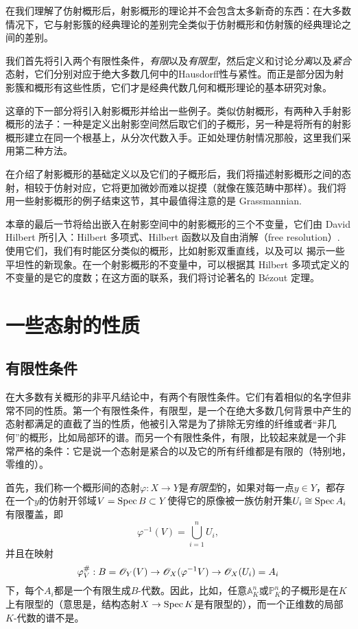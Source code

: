 在我们理解了仿射概形后，射影概形的理论并不会包含太多新奇的东西：在大多数情况下，它与射影簇的经典理论的差别完全类似于仿射概形和仿射簇的经典理论之间的差别。

我们首先将引入两个有限性条件，\textit{有限}以及\textit{有限型}，然后定义和讨论\textit{分离}以及\textit{紧合}态射，它们分别对应于绝大多数几何中的Hausdorff性与紧性。而正是部分因为射影簇和概形有这些性质，它们才是经典代数几何和概形理论的基本研究对象。

这章的下一部分将引入射影概形并给出一些例子。类似仿射概形，有两种入手射影概形的法子：一种是定义出射影空间然后取它们的子概形，另一种是将所有的射影概形建立在同一个根基上，从分次代数入手。正如处理仿射情况那般，这里我们采用第二种方法。

在介绍了射影概形的基础定义以及它们的子概形后，我们将描述射影概形之间的态射，相较于仿射对应，它将更加微妙而难以捉摸（就像在簇范畴中那样）。我们将用一些射影概形的例子结束这节，其中最值得注意的是 Grassmannian.

本章的最后一节将给出嵌入在射影空间中的射影概形的三个不变量，它们由 David Hilbert 所引入：Hilbert 多项式、Hilbert 函数以及自由消解（free resolution）. 使用它们，我们有时能区分类似的概形，比如射影双重直线，以及可以
揭示一些平坦性的新现象。在一个射影概形的不变量中，可以根据其 Hilbert 多项式定义的不变量的是它的度数；在这方面的联系，我们将讨论著名的 B\'{e}zout 定理。

\section{一些态射的性质}\label{s:3.1}

\subsection{有限性条件}\label{s:3.1.1}

在大多数有关概形的非平凡结论中，有两个有限性条件。它们有着相似的名字但非常不同的性质。第一个有限性条件，有限型，是一个在绝大多数几何背景中产生的态射都满足的直截了当的性质，他被引入常是为了排除无穷维的纤维或者“非几何”的概形，比如局部环的谱。而另一个有限性条件，有限，比较起来就是一个非常严格的条件：它是说一个态射是紧合的以及它的所有纤维都是有限的（特别地，零维的）。

首先，我们称一个概形间的态射$\varphi:X\to Y$是\textit{有限型}的，如果对每一点$y\in Y$，都存在一个$y$的仿射开邻域$V=\operatorname{Spec} B\subset Y$使得它的原像被一族仿射开集$U_i\cong \operatorname{Spec} A_i$有限覆盖，即
\[
	\varphi^{-1}(V)=\bigcup_{i=1}^n U_i,
\]
并且在映射
\[
	\varphi_V^\#:B=\mathscr{O}_Y(V)\to \mathscr{O}_X (\varphi^{-1}V)\to \mathscr{O}_X(U_i)=A_i
\]
下，每个$A_i$都是一个有限生成$B$\hyp 代数。因此，比如，任意$\mathbb{A}_K^n$或$\mathbb{P}_K^n$的子概形是在$K$上有限型的（意思是，结构态射$X\to \operatorname{Spec} K$是有限型的），而一个正维数的局部$K$\hyp 代数的谱不是。

